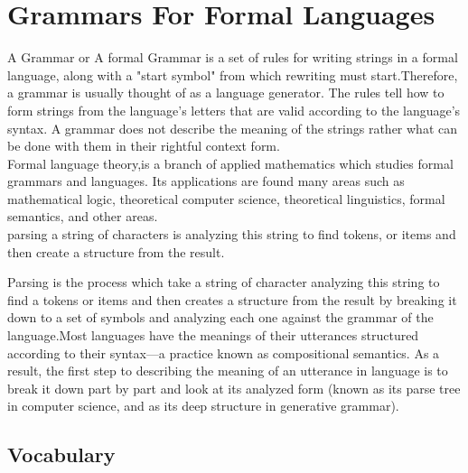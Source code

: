 
\section{Grammars For Formal Languages}

A Grammar or A formal Grammar is a set of rules for writing strings in a formal language, along with a "start symbol" from which rewriting must start.Therefore, a grammar is usually thought of as a language generator. The rules tell how to form strings from the language's letters that are valid according to the language's syntax. A grammar does not describe the meaning of the strings rather  what can be done with them in their rightful context form.\\


Formal language theory,is a branch of applied mathematics which studies formal grammars and languages. Its applications are found many areas such as mathematical logic, theoretical computer science, theoretical linguistics, formal semantics,  and other areas.\\


parsing a string of characters is analyzing this string to find tokens, or items and then create a structure from the result.

Parsing is the process which take a string of  character analyzing this string to find a tokens or items and then creates a structure from the result by breaking it down to a set of symbols and analyzing each one against the grammar of the language.Most languages have the meanings of their utterances structured according to their syntax—a practice known as compositional semantics. As a result, the first step to describing the meaning of an utterance in language is to break it down part by part and look at its analyzed form (known as its parse tree in computer science, and as its deep structure in generative grammar).


\subsection{Vocabulary}

